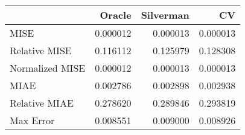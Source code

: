 \begin{tabular}{lrrr}
  \hline
 & Oracle & Silverman & CV \\ 
  \hline
MISE & 0.000012 & 0.000013 & 0.000013 \\ 
  Relative MISE & 0.116112 & 0.125979 & 0.128308 \\ 
  Normalized MISE & 0.000012 & 0.000013 & 0.000013 \\ 
  MIAE & 0.002786 & 0.002898 & 0.002938 \\ 
  Relative MIAE & 0.278620 & 0.289846 & 0.293819 \\ 
  Max Error & 0.008551 & 0.009000 & 0.008926 \\ 
   \hline
\end{tabular}
